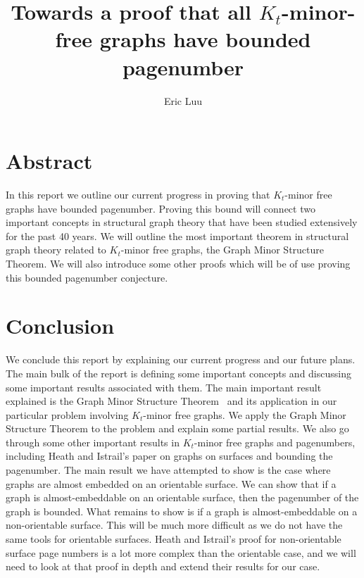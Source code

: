 \documentclass[]{report}
\title{Towards a proof that all \(K_t\)-minor-free graphs have bounded pagenumber}
\author{Eric Luu}
\theoremstyle{definition}
\numberwithin{theorem}{section}
\numberwithin{equation}{section}
\begin{document}
\maketitle
\listoftodos
\tableofcontents
\chapter{Abstract}\label{abstract}
In this report we outline our current progress in proving that \(K_t\)-minor free graphs have bounded pagenumber. Proving this bound will connect two important concepts in structural graph theory that have been studied extensively for the past 40 years. We will outline the most important theorem in structural graph theory related to \(K_t\)-minor free graphs, the Graph Minor Structure Theorem. We will also introduce some other proofs which will be of use proving this bounded pagenumber conjecture. 




	
	
	



\chapter{Conclusion}\label{chap:conclusion}
We conclude this report by explaining our current progress and our future plans. 
The main bulk of the report is defining some important concepts and discussing some important results associated with them.
The main important result explained is the Graph Minor Structure Theorem~\cite{robertsonGraphMinorsXVI2003} and its application in our particular problem involving \(K_t\)-minor free graphs. We apply the Graph Minor Structure Theorem to the problem and explain some partial results.
We also go through some other important results in \(K_t\)-minor free graphs and pagenumbers, including Heath and Istrail's \cite{heathPagenumberGenusGraphs1992} paper on graphs on surfaces and bounding the pagenumber.
The main result we have attempted to show is the case where graphs are almost embedded on an orientable surface. We can show that if a graph is almost-embeddable on an orientable surface, then the pagenumber of the graph is bounded.
What remains to show is if a graph is almost-embeddable on a non-orientable surface. This will be much more difficult as we do not have the same tools for orientable surfaces. Heath and Istrail's proof for non-orientable surface page numbers is a lot more complex than the orientable case, and we will need to look at that proof in depth and extend their results for our case.
\printbibliography{}
\end{document}
